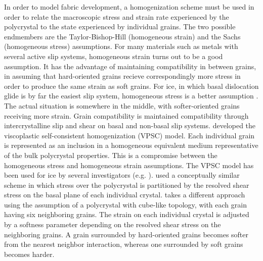 \documentclass{article}
\begin{document}
In order to model fabric development, a homogenization scheme must be used in order to relate the macroscopic stress and strain rate experienced by the polycrystal to the state experienced by individual grains. The two possible endmembers are the Taylor-Bishop-Hill (homogeneous strain) \citep{taylor} and the Sachs (homogeneous stress) \citep{sachs} assumptions. For many materials such as metals with several active slip systems, homogeneous strain turns out to be a good assumption. It has the advantage of maintaining compatibility in between grains, in assuming that hard-oriented grains recieve correspondingly more stress in order to produce the same strain as soft grains. For ice, in which basal dislocation glide is by far the easiest slip system, homogeneous stress is a better assumption \citep{thorsteinsson2002nni}. The actual situation is somewhere in the middle, with softer-oriented grains receiving more strain. Grain compatibility is maintained compatibility through intercrystalline slip and shear on basal and non-basal slip systems. \citet{molinari} developed the viscoplastic self-consistent homogenization (VPSC) model. Each individual grain is represented as an inclusion in a homogeneous equivalent medium representative of the bulk polycrystal properties. This is a compromise between the homogeneous stress and homogeneous strain assumptions. The VPSC model has been used for ice by several investigators (e.g. \citet{gillet2005}). \citet{azuma96} used a conceptually similar scheme in which stress over the polycrystal is partitioned by the resolved shear stress on the basal plane of each individual crystal. \citet{thorsteinsson2002nni} takes a different approach using the assumption of a polycrystal with cube-like topology, with each grain having six neighboring grains. The strain on each individual crystal is adjusted by a softness parameter depending on the resolved shear stress on the neighboring grains. A grain surrounded by hard-oriented grains becomes softer from the nearest neighbor interaction, whereas one surrounded by soft grains becomes harder.
\end{document}

